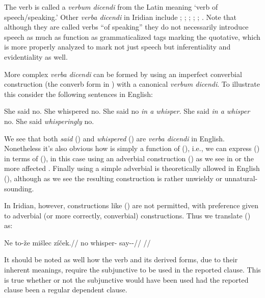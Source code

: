 The verb  is called a \emph{verbum dicendi} from the Latin meaning ‘verb of speech/speaking.’ Other \emph{verba dicendi} in Iridian include ; ; ; ; ; . Note that although they are called verbs ``of speaking'' they do not necessarily introduce speech as much as function as grammaticalized tags marking the quotative,  which is more properly analyzed to mark not just speech but inferentiality and evidentiality as well.

More complex \emph{verba dicendi} can be formed by using an imperfect converbial construction (the converb form in ) with a canonical \emph{verbum dicendi}. To illustrate this consider the following sentences in English:

\pex[*=?*,interpartskip=0pt]
\a She said no.
\a She whispered no.
\a She said no \emph{in a whisper}.
\a {} She said \emph{in a whisper} no.
\a {} She said \emph{whisperingly} no.
\xe

We see that both \emph{said} () and \emph{whispered} () are \emph{verba dicendi} in English. Nonetheless it's also obvious how  is simply a function of (), i.e., we can express () in terms of (), in this case using an adverbial construction () as we see in  or the more affected . Finally using a simple adverbial is theoretically allowed in English (), although as we see the resulting construction is rather unwieldy or unnatural-sounding.

In Iridian, however, constructions like () are not permitted, with preference given to adverbial (or more correctly, converbial) constructions. Thus we translate () as:

\pex
\begingl
\gla Ne to-že mišlec zíček.//
\glb no  whisper-\Cv{} say-\Av{}-\Pf{}//
\glft {}//
\endgl
\xe

It should be noted as well how the verb  and its derived forms, due to their inherent meanings, require the subjunctive to be used in the reported clause. This is true whether or not the subjunctive would have been used had the reported clause been a regular dependent clause.


